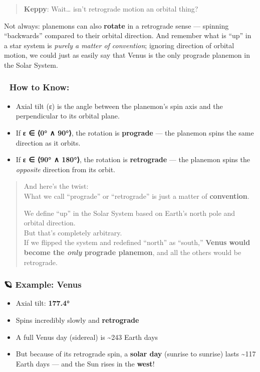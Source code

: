 \documentclass[
  letterpaper,
]{book}
\providecommand{\tightlist}{%
  \setlength{\itemsep}{0pt}\setlength{\parskip}{0pt}}
\begin{document}
\begin{quote}
\textbf{Keppy}: Wait\ldots{} isn't retrograde motion an orbital thing?
\end{quote}

Not always: planemons can also \textbf{rotate} in a retrograde sense ---
spinning ``backwards'' compared to their orbital direction. And remember
what is ``up'' in a star system is \emph{purely a matter of convention};
ignoring direction of orbital motion, we could just as easily say that
Venus is the only prograde planemon in the Solar System.

\subsubsection{🧭 How to Know:}\label{how-to-know}

\begin{itemize}
\tightlist
\item
  Axial tilt (ε) is the angle between the planemon's spin axis and the
  perpendicular to its orbital plane.
\item
  If \textbf{ε ∈ ⟨0° ∧ 90°⟩}, the rotation is \textbf{prograde} --- the
  planemon spins the same direction as it orbits.
\item
  If \textbf{ε ∈ ⟨90° ∧ 180°⟩}, the rotation is \textbf{retrograde} ---
  the planemon spins the \emph{opposite} direction from its orbit.
\end{itemize}

\begin{quote}
And here's the twist:\\
What we call ``prograde'' or ``retrograde'' is just a matter of
\textbf{convention}.

We define ``up'' in the Solar System based on Earth's north pole and
orbital direction.\\
But that's completely arbitrary.\\
If we flipped the system and redefined ``north'' as ``south,''
\textbf{Venus would become the \emph{only} prograde planemon}, and all
the others would be retrograde.
\end{quote}

\subsubsection{🪐 Example: Venus}\label{example-venus}

\begin{itemize}
\tightlist
\item
  Axial tilt: \textbf{177.4°}
\item
  Spins incredibly slowly and \textbf{retrograde}
\item
  A full Venus day (sidereal) is \textasciitilde243 Earth days
\item
  But because of its retrograde spin, a \textbf{solar day} (sunrise to
  sunrise) lasts \textasciitilde117 Earth days --- and the Sun rises in
  the \textbf{west}!
\end{itemize}
\end{document}
